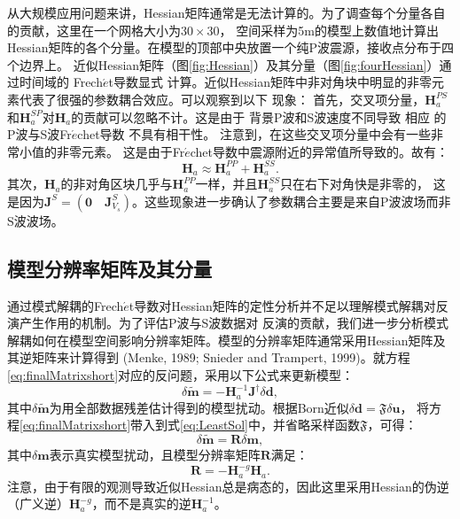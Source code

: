 从大规模应用问题来讲，Hessian矩阵通常是无法计算的。为了调查每个分量各自的贡献，这里在一个网格大小为$30\times30$，
空间采样为5m的模型上数值地计算出Hessian矩阵的各个分量。在模型的顶部中央放置一个纯P波震源，接收点分布于四个边界上。
近似Hessian矩阵（图\ref{fig:Hessian}）及其分量（图\ref{fig:fourHessian}）通过时间域的
Frech{$\acute{e}$}t导数显式
计算。近似Hessian矩阵中非对角块中明显的非零元素代表了很强的参数耦合效应。可以观察到以下
现象：
首先，交叉项分量，$\mathbf{H}_a^{PS}$和$\mathbf{H}_a^{SP}$对$\mathbf{H}_a$的贡献可以忽略不计。这是由于
背景P波和S波速度不同导致
相应
的P波与S波Fr{$\acute{e}$}chet导数
不具有相干性。
注意到，在这些交叉项分量中会有一些非常小值的非零元素。
这是由于Fr{$\acute{e}$}chet导数中震源附近的异常值所导致的。故有：
\begin{equation}
        \mathbf{H}_a\approx
        \mathbf{H}_a^{PP}+
        \mathbf{H}_a^{SS}.
        \label{eq:C3}
\end{equation}
其次，$\mathbf{H}_a$的非对角区块几乎与$\mathbf{H}_a^{PP}$一样，并且$\mathbf{H}_a^{SS}$只在右下对角快是非零的，
这是因为$\mathbf{J}^S=(\mathbf{0}\quad\mathbf{J}^S_{V_s})$。这些现象进一步确认了参数耦合主要是来自P波波场而非S波波场。
\subsection{模型分辨率矩阵及其分量}
通过模式解耦的Frech{$\acute{e}$}t导数对Hessian矩阵的定性分析并不足以理解模式解耦对反演产生作用的机制。为了评估P波与S波数据对
反演的贡献，我们进一步分析模式解耦如何在模型空间影响分辨率矩阵。模型的分辨率矩阵通常采用Hessian矩阵及其逆矩阵来计算得到
(Menke, 1989\cite[]{menke:1989}; Snieder and Trampert, 1999\cite{snieder1999inverse})。就方程\eqref{eq:finalMatrixshort}对应的反问题，采用以下公式来更新模型：
\begin{equation}
	\delta \tilde{\mathbf{m}}=-\mathbf{H}^{-1}_a\mathbf{J}^{\dagger}\delta 
        \mathbf{d},
        \label{eq:LeastSol}
\end{equation}
其中$\delta\tilde{\mathbf{m}}$为用全部数据残差估计得到的模型扰动。根据Born近似$\delta\mathbf{d}=\mathfrak{F}{\delta\mathbf{u}}$，
将方程\eqref{eq:finalMatrixshort}带入到式\eqref{eq:LeastSol}中，并省略采样函数$\mathfrak{F}$，可得：
\begin{equation}
	\delta \tilde{\mathbf{m}}=\mathbf{R}\delta \mathbf{m},
	\label{eq:ResoMatr}
\end{equation}
其中$\delta \mathbf{m}$表示真实模型扰动，且模型分辨率矩阵$\mathbf{R}$满足：
\begin{equation}
        \mathbf{R}=-\mathbf{H}^{-g}_a\mathbf{H}_a. 
        \label{eq:ResoOper} 
\end{equation}
注意，由于有限的观测导致近似Hessian总是病态的，因此这里采用Hessian的伪逆（广义逆）$\mathbf{H}^{-g}_a$，而不是真实的逆$\mathbf{H}^{-1}_a$。

